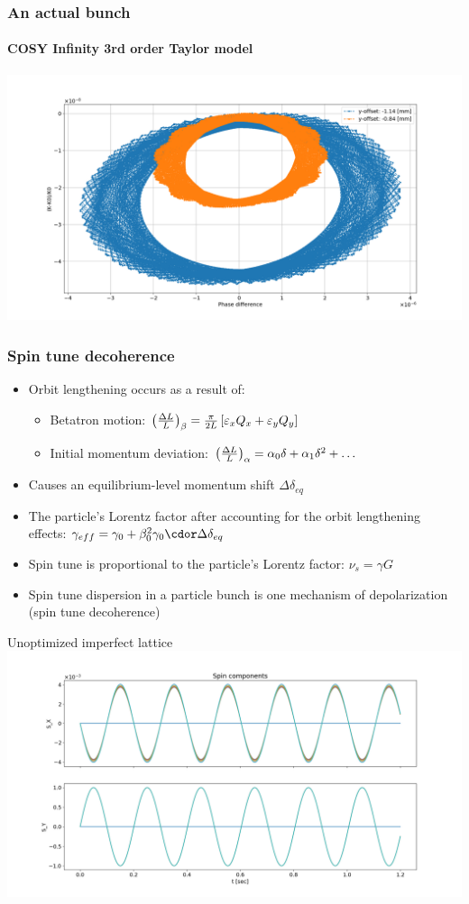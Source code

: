 \documentclass{beamer}
\begin{document}
\begin{frame}\frametitle{An actual bunch} \framesubtitle{COSY Infinity 3rd order Taylor model}
  \centering
  \includegraphics[width=\linewidth]{../img/SEMINAR/psp_diagram_betatron}
\end{frame}

\begin{frame}\frametitle{Spin tune decoherence}
  \begin{itemize}
  \item Orbit lengthening occurs as a result of:
    \begin{itemize}
    \item Betatron motion: $\bkt{\frac{\Delta L}{L}}_\beta = \frac{\pi}{2L}\bkt*{\varepsilon_xQ_x + \varepsilon_yQ_y}$
    \item Initial momentum deviation: $\bkt{\frac{\Delta L}{L}}_\alpha = \alpha_0\delta + \alpha_1\delta^2 + \dots$
    \end{itemize}
  \item Causes an equilibrium-level momentum shift $\Delta\delta_{eq}$
  \item The particle's Lorentz factor after accounting for the orbit lengthening effects: $\gamma_{eff} = \gamma_0 + \beta_0^2\gamma_0\cdor \Delta\delta_{eq}$
  \item Spin tune is proportional to the particle's Lorentz factor: $\nu_s = \gamma G$
  \item Spin tune dispersion in a particle bunch is one mechanism of depolarization (spin tune decoherence)
  \end{itemize}
\end{frame}

\begin{frame}{Unoptimized imperfect lattice}
  \centering
  \includegraphics[width=\linewidth, trim=85 25 120 55, clip]{../img/SEMINAR/SXSY_10pcls_1sec}
\end{frame}
\end{document}

